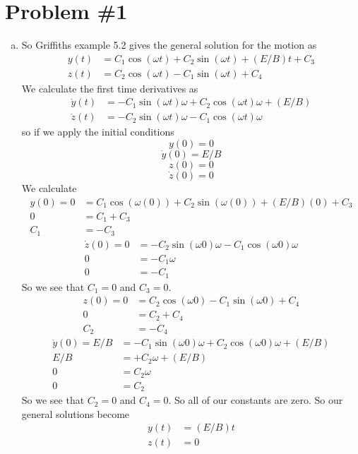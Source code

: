 \documentclass[11pt]{article}
\numberwithin{equation}{section}
\begin{document}


\section{Problem \#1}
\begin{enumerate}[(a)]
\item
So Griffiths example 5.2 gives the general solution for the motion as
\begin{align*}
y(t) &= C_1\cos(\omega t)+C_2\sin(\omega t)+(E/B)t+C_3\\
z(t) &= C_2\cos(\omega t)-C_1\sin(\omega t)+C_4
\end{align*}
We calculate the first time derivatives as
\begin{align*}
\dot{y}(t) &= -C_1\sin(\omega t)\omega + C_2\cos(\omega t)\omega+(E/B)\\
\dot{z}(t) &= -C_2\sin(\omega t)\omega-C_1\cos(\omega t)\omega
\end{align*}
so if we apply the initial conditions 
$$y(0) = 0$$
$$\dot{y}(0) = E/B$$
$$z(0) = 0$$
$$\dot{z}(0) = 0$$
We calculate 
\begin{align*}
y(0)=0 &= C_1\cos(\omega (0))+C_2\sin(\omega (0))+(E/B)(0)+C_3\\
0 &= C_1+C_3\\
C_1 &= -C_3
\end{align*}
\begin{align*}
\dot{z}(0) = 0 &= -C_2\sin(\omega 0)\omega-C_1\cos(\omega 0)\omega\\
0 &= -C_1\omega\\
0 &= -C_1
\end{align*}
So we see that $C_1=0$ and $C_3=0$. 
\begin{align*}
z(0) = 0 &= C_2\cos(\omega 0)-C_1\sin(\omega 0)+C_4\\
0 &= C_2+C_4\\
C_2 &= -C_4
\end{align*}
\begin{align*}
\dot{y}(0) = E/B &= -C_1\sin(\omega 0)\omega + C_2\cos(\omega 0)\omega+(E/B)\\
E/B &=  + C_2\omega+(E/B)\\
0 &= C_2\omega\\
0 &= C_2
\end{align*}
So we see that $C_2=0$ and $C_4=0$. So all of our constants are zero. So our general solutions become 
\begin{align*}
y(t) &= (E/B)t\\
z(t) &= 0
\end{align*}


\end{enumerate}
\end{document}
